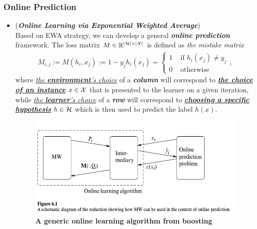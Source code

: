 \documentclass[11pt]{article}
\begin{document}
\subsubsection{Online Prediction}
\begin{itemize}
\item \begin{remark}(\textbf{\emph{Online Learning via Exponential Weighted Average}}) \citep{schapire2012boosting, mohri2018foundations} \\
Based on EWA strategy, we can develop a general \emph{\textbf{online prediction}} framework. The loss matrix $M \in {\mathbb R}^{\left\lvert {\mathcal H} \right\rvert \times \left\lvert {\mathcal X} \right\rvert}$ is defined as \emph{the mistake matrix}
\begin{align*}
M_{i,j} := M(h_i, x_j) :=  1 - y_j h_i(x_j) = \left\{ \begin{array}{cc}
1 &\text{ if }h_i(x_j) \neq y_j \\
0 &\text{ otherwise}
\end{array}
\right. ,
\end{align*} where \underline{\emph{the \textbf{environment}'s choice}} of a \emph{\textbf{column}} will correspond to \underline{\emph{\textbf{the choice of an instance}}} $x \in {\mathcal X}$ that is presented to the learner on a given iteration, while \underline{\emph{the \textbf{learner}'s choice}} of a \emph{\textbf{row}} will correspond to \underline{\emph{\textbf{choosing a specific hypothesis}}} $h \in {\mathcal H}$ which is then used to predict the label $h(x)$. 

\begin{figure}
\begin{minipage}[h!]{1\linewidth}
  \centering
  \centerline{\includegraphics[scale = 0.5]{online_learning_boost.png}}
\end{minipage}
\caption{\footnotesize{\textbf{A generic online learning algorithm from boosting \citep{schapire2012boosting}}}}
\label{fig: online_learning_boost}
\end{figure}


\end{remark}
\end{itemize}
\end{document}
